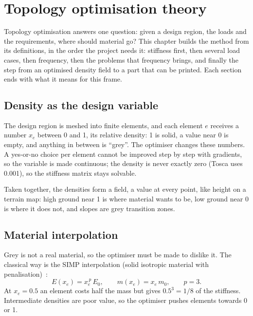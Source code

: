 \chapter{Topology optimisation theory}\label{sec:topopt_theory}

Topology optimisation answers one question: given a design region, the loads and the requirements, where should material go? This chapter builds the method from its definitions, in the order the project needs it: stiffness first, then several load cases, then frequency, then the problems that frequency brings, and finally the step from an optimised density field to a part that can be printed. Each section ends with what it means for this frame.

\section{Density as the design variable}\label{sec:to-density}

The design region is meshed into finite elements, and each element $e$ receives a number $x_e$ between 0 and 1, its relative density: 1 is solid, a value near 0 is empty, and anything in between is ``grey''. The optimiser changes these numbers. A yes-or-no choice per element cannot be improved step by step with gradients, so the variable is made continuous; the density is never exactly zero (Tosca uses 0.001), so the stiffness matrix stays solvable.

Taken together, the densities form a field, a value at every point, like height on a terrain map: high ground near 1 is where material wants to be, low ground near 0 is where it does not, and slopes are grey transition zones.

\section{Material interpolation}\label{sec:to-simp}

Grey is not a real material, so the optimiser must be made to dislike it. The classical way is the SIMP interpolation (solid isotropic material with penalisation)~\citep{bendsoe_sigmund}:
\begin{equation}
E(x_e) = x_e^{\,p}\, E_0, \qquad m(x_e) = x_e\, m_0, \qquad p = 3.
\end{equation}
At $x_e = 0.5$ an element costs half the mass but gives $0.5^3 = 1/8$ of the stiffness. Intermediate densities are poor value, so the optimiser pushes elements towards 0 or 1.

